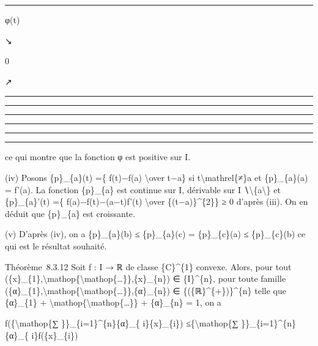 \documentclass[]{article}
\begin{document}
\begin{center}\rule{3in}{0.4pt}\end{center}

φ(t)

↘

0

↗

\begin{center}\rule{3in}{0.4pt}\end{center}

\begin{center}\rule{3in}{0.4pt}\end{center}

\begin{center}\rule{3in}{0.4pt}\end{center}

\begin{center}\rule{3in}{0.4pt}\end{center}

\begin{center}\rule{3in}{0.4pt}\end{center}

\begin{center}\rule{3in}{0.4pt}\end{center}

ce qui montre que la fonction φ est positive sur I.

(iv) Posons \{p\}\_\{a\}(t) =\{ f(t)−f(a) \textbackslash{}over t−a\} si
t\textbackslash{}mathrel\{≠\}a et \{p\}\_\{a\}(a) = f'(a). La fonction
\{p\}\_\{a\} est continue sur I, dérivable sur I
∖\textbackslash{}\{a\textbackslash{}\} et \{p\}\_\{a\}'(t) =\{
f(a)−f(t)−(a−t)f'(t) \textbackslash{}over \{(t−a)\}\^{}\{2\}\} ≥ 0
d'après (iii). On en déduit que \{p\}\_\{a\} est croissante.

(v) D'après (iv), on a \{p\}\_\{a\}(b) ≤ \{p\}\_\{a\}(c) =
\{p\}\_\{c\}(a) ≤ \{p\}\_\{c\}(b) ce qui est le résultat souhaité.

Théorème~8.3.12 Soit f : I → ℝ de classe \{C\}\^{}\{1\} convexe. Alors,
pour tout
(\{x\}\_\{1\},\textbackslash{}mathop\{\textbackslash{}mathop\{\ldots{}\}\},\{x\}\_\{n\})
∈ \{I\}\^{}\{n\}, pour toute famille
(\{α\}\_\{1\},\textbackslash{}mathop\{\textbackslash{}mathop\{\ldots{}\}\},\{α\}\_\{n\})
∈ \{(\{ℝ\}\^{}\{+\})\}\^{}\{n\} telle que \{α\}\_\{1\} +
\textbackslash{}mathop\{\textbackslash{}mathop\{\ldots{}\}\} +
\{α\}\_\{n\} = 1, on a

f(\{\textbackslash{}mathop\{∑ \}\}\_\{i=1\}\^{}\{n\}\{α\}\_\{
i\}\{x\}\_\{i\}) ≤\{\textbackslash{}mathop\{∑
\}\}\_\{i=1\}\^{}\{n\}\{α\}\_\{ i\}f(\{x\}\_\{i\})
\end{document}
